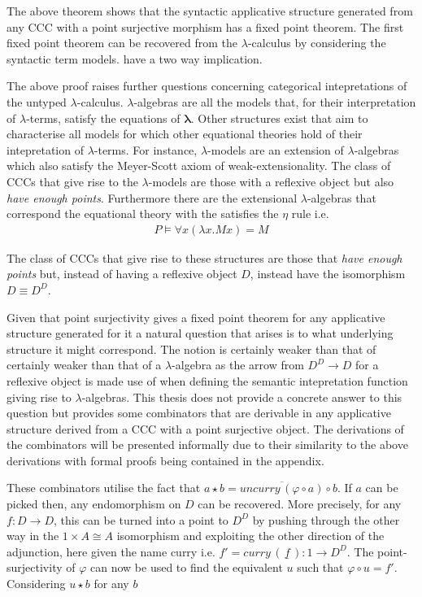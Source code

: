 The above theorem shows that the syntactic applicative structure generated from
any CCC with a point surjective morphism has a fixed point theorem. The first
fixed point theorem can be recovered from the $\lambda$-calculus by considering
the syntactic term models.  have a two way implication.

The above proof raises further questions concerning categorical intepretations
of the untyped $\lambda$-calculus. $\lambda$-algebras are all the models that,
for their interpretation of $\lambda$-terms, satisfy the equations of
$\bm{\lambda}$. Other structures exist that aim to characterise all models for
which other equational theories hold of their intepretation of $\lambda$-terms.
For instance, $\lambda$-models are an extension of $\lambda$-algebras which also
satisfy the Meyer-Scott axiom of weak-extensionality. The class of CCCs that
give rise to the $\lambda$-models are those with a reflexive object but also
\textit{have enough points}.  Furthermore there are the
extensional $\lambda$-algebras that correspond the equational theory with the
satisfies the $\eta$ rule i.e.
\begin{align*} P \vDash \forall x (\lambda x . M
    x) = M
\end{align*}

The class of CCCs that give rise to these structures are those that \textit{have
enough points} but, instead of having a reflexive object $D$, instead have the
isomorphism $D \equiv D^{D}$.

Given that point surjectivity gives a fixed point theorem for any applicative
structure generated for it a natural question that arises is to what underlying
structure it might correspond. The notion is certainly weaker than that of
certainly weaker than that of a $\lambda$-algebra as the arrow from $D^{D}
\rightarrow D$ for a reflexive object is made use of when defining the semantic
intepretation function giving rise to $\lambda$-algebras. This thesis does not
provide a concrete answer to this question but provides some combinators that
are derivable in any applicative structure derived from a CCC with a point
surjective object. The derivations of the combinators will be presented
informally due to their similarity to the above derivations with formal proofs
being contained in the appendix.

These combinators utilise the fact that $a \star b =
\overline{uncurry \, (\varphi \circ a)} \circ b$. If  $a$ can be picked
then, any endomorphism on $D$ can be recovered. More precisely, for any $f:
D \rightarrow D$, this can be turned into a point to $D^D$ by pushing through
the other way in the $1 \times A \cong A$ isomorphism and exploiting the other
direction of the adjunction, here given the name curry i.e. $f' = curry \, (
\,\underline{f} \,) : 1 \rightarrow D^D$. The point-surjectivity of $\varphi$
can now be used to find the equivalent $u$ such that $\varphi \circ u = f'$.
Considering $u \star b$ for any $b$

